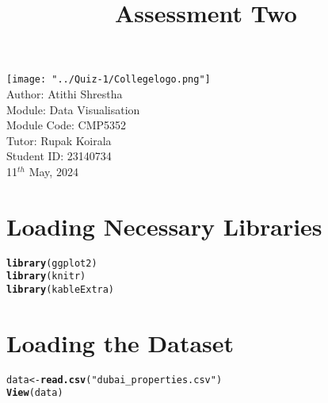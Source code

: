 \documentclass{article}\usepackage[]{graphicx}\usepackage[]{xcolor}
\title{Assessment Two}
\makeatletter
\newcommand{\hlstr}[1]{\textcolor[rgb]{0.192,0.494,0.8}{#1}}%
\newcommand{\hlstd}[1]{\textcolor[rgb]{0.345,0.345,0.345}{#1}}%
\newcommand{\hlkwb}[1]{\textcolor[rgb]{0.69,0.353,0.396}{#1}}%
\newcommand{\hlkwd}[1]{\textcolor[rgb]{0.737,0.353,0.396}{\textbf{#1}}}%
\newenvironment{kframe}{%
 \def\at@end@of@kframe{}%
 \ifinner\ifhmode%
  \def\at@end@of@kframe{\end{minipage}}%
  \begin{minipage}{\columnwidth}%
 \fi\fi%
 \def\FrameCommand##1{\hskip\@totalleftmargin \hskip-\fboxsep
 \colorbox{shadecolor}{##1}\hskip-\fboxsep
     \hskip-\linewidth \hskip-\@totalleftmargin \hskip\columnwidth}%
 \MakeFramed {\advance\hsize-\width
   \@totalleftmargin\z@ \linewidth\hsize
   \@setminipage}}%
 {\par\unskip\endMakeFramed%
 \at@end@of@kframe}
\newenvironment{knitrout}{}{} %
\makeatother
\begin{document}
\begin{titlepage}
    \centering
    \vspace*{0.5cm}
    \texttt{[image: "../Quiz-1/Collegelogo.png"]}\\[1cm] 
    {\Large Author: Atithi Shrestha}\\[0.5cm]
    {\large Module: Data Visualisation}\\[0.5cm]
    {\large Module Code: CMP5352}\\[0.5cm]
    {\large Tutor: Rupak Koirala}\\[0.5 cm]
    {\large Student ID: 23140734}\\[0.5cm]
    \vspace*{\fill}
11$^{th}$ May, 2024
\end{titlepage}

\newpage

\tableofcontents
\newpage

\listoffigures
\newpage

\listoftables
\newpage

\section{Loading Necessary Libraries}
\begin{knitrout}
\color{fgcolor}\begin{kframe}
\begin{alltt}
\hlkwd{library}\hlstd{(ggplot2)}
\hlkwd{library}\hlstd{(knitr)}
\hlkwd{library}\hlstd{(kableExtra)}
\end{alltt}
\end{kframe}
\end{knitrout}

\section{Loading the Dataset}
\begin{knitrout}
\color{fgcolor}\begin{kframe}
\begin{alltt}
\hlstd{data} \hlkwb{<-} \hlkwd{read.csv}\hlstd{(}\hlstr{"dubai_properties.csv"}\hlstd{)}
\hlkwd{View}\hlstd{(data)}
\end{alltt}
\end{kframe}
\end{knitrout}
\end{document}

